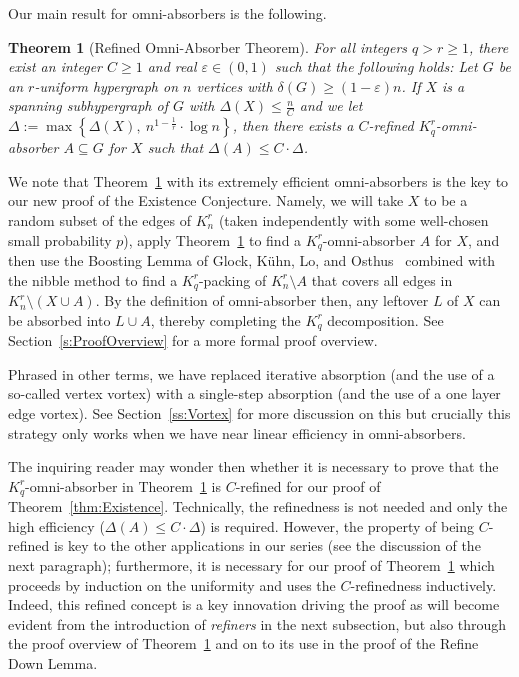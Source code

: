 \documentclass[11pt]{article}
\newcounter{i}
\theoremstyle{plain}
\newtheorem{thm}{Theorem}[section]
\theoremstyle{plain} %
\theoremstyle{definition}
\begin{document}
Our main result for omni-absorbers is the following. 

\begin{thm}[Refined Omni-Absorber Theorem]\label{thm:Omni}
For all integers $q > r\ge 1$, there exist an integer $C\ge 1$ and real $\varepsilon\in (0,1)$ such that the following holds: Let $G$ be an $r$-uniform hypergraph on $n$ vertices with $\delta(G)\ge (1-\varepsilon)n$. If $X$ is a spanning subhypergraph of $G$ with $\Delta(X) \le \frac{n}{C}$ and we let $\Delta:= \max\left\{\Delta(X),~n^{1-\frac{1}{r}}\cdot \log n\right\}$, then there exists a $C$-refined $K_q^r$-omni-absorber $A\subseteq G$ for $X$ such that $\Delta(A)\le C \cdot \Delta$. 
\end{thm}

We note that Theorem~\ref{thm:Omni} with its extremely efficient omni-absorbers is the key to our new proof of the Existence Conjecture. Namely, we will take $X$ to be a random subset of the edges of $K_n^r$ (taken independently with some well-chosen small probability $p$), apply Theorem~\ref{thm:Omni} to find a $K_q^r$-omni-absorber $A$ for $X$, and then use the Boosting Lemma of Glock, K\"{u}hn, Lo, and Osthus~\cite{GKLO16} combined with the nibble method to find a $K_q^r$-packing of $K_n^r\setminus A$ that covers all edges in $K_n^r\setminus (X\cup A)$. By the definition of omni-absorber then, any leftover $L$ of $X$ can be absorbed into $L\cup A$, thereby completing the $K_q^r$ decomposition. See Section~\ref{s:ProofOverview} for a more formal proof overview. 

Phrased in other terms, we have replaced iterative absorption (and the use of a so-called vertex vortex) with a single-step absorption (and the use of a one layer edge vortex). See Section~\ref{ss:Vortex} for more discussion on this but crucially this strategy only works when we have near linear efficiency in omni-absorbers.

The inquiring reader may wonder then whether it is necessary to prove that the $K_q^r$-omni-absorber in Theorem~\ref{thm:Omni} is $C$-refined for our proof of Theorem~\ref{thm:Existence}. Technically, the refinedness is not needed and only the high efficiency ($\Delta(A)\le C\cdot \Delta$) is required. However, the property of being $C$-refined is key to the other applications in our series (see the discussion of the next paragraph); furthermore, it is necessary for our proof of Theorem~\ref{thm:Omni} which proceeds by induction on the uniformity and uses the $C$-refinedness inductively. Indeed, this refined concept is a key innovation driving the proof as will become evident from the introduction of \emph{refiners} in the next subsection, but also through the proof overview of Theorem~\ref{thm:Omni} and on to its use in the proof of the Refine Down Lemma.
\end{document}

